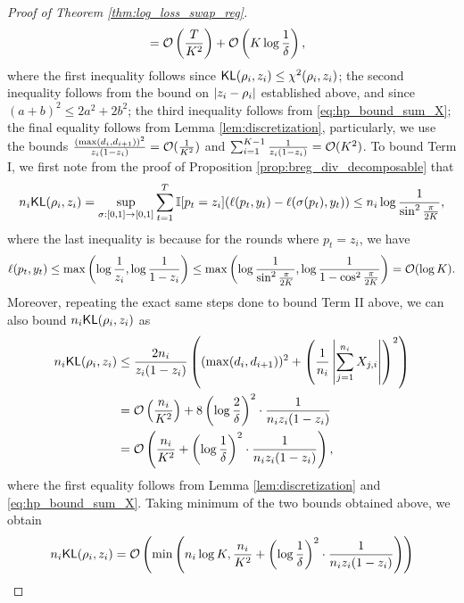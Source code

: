 \begin{proof}[Proof of Theorem \ref{thm:log_loss_swap_reg}]
\begin{align*}
        &= \mathcal{O}\left( \frac{T}{K ^ {2}} \right) + \mathcal{O}\left( K \log \frac{1}{\delta} \right),
    \end{align*}
    where the first inequality follows since $\mathsf{KL}(\rho_{i}, z_{i}) \le \chi^{2}(\rho_{i}, z_{i})$; the second inequality follows from the bound on $\left\lvert z_{i} - \rho_{i}\right\rvert$ established above, and since $(a + b) ^ {2} \le 2 a ^ {2} + 2 b ^ {2}$; the third inequality follows from \eqref{eq:hp_bound_sum_X}; the final equality follows from Lemma \ref{lem:discretization}, particularly, we use the bounds $\frac{(\max(d_{i}, d_{i + 1})) ^ {2}}{z_{i} (1 - z_{i})} = \mathcal{O}(\frac{1}{K^{2}})$ and $\sum_{i = 1} ^ {K - 1} \frac{1}{z_{i}(1 - z_{i})} = \mathcal{O}(K ^ {2})$. To bound Term I, we first note from the proof of Proposition \ref{prop:breg_div_decomposable} that \begin{align*}
        n_{i} \mathsf{KL}(\rho_{i}, z_{i}) = \sup_{\sigma: [0, 1] \to [0, 1]} \sum_{t = 1} ^ {T} \mathbb{I}{\left[p_{t} = z_{i}\right]} (\ell(p_{t}, y_{t}) - \ell(\sigma(p_{t}), y_{t})) \le n_{i} \log \frac{1}{\sin ^ {2} \frac{\pi}{2K}},
    \end{align*}
    where the last inequality is because for the rounds where $p_{t} = z_{i}$, we have \begin{align}\label{eq:range_log_loss}
    \ell(p_{t}, y_{t}) \le \max\left( \log \frac{1}{z_{i}}, \log \frac{1}{1 - z_{i}} \right) \le \max \left( \log \frac{1}{\sin ^ {2} \frac{\pi}{2K}}, \log \frac{1}{1 - \cos ^ {2} \frac{\pi}{2K}} \right) = \mathcal{O}(\log K). 
    \end{align}
    Moreover, repeating the exact same steps done to bound Term II above, we can also bound $n_{i} \mathsf{KL}(\rho_{i}, z_{i})$ as \begin{align*}
        n_{i} \mathsf{KL}(\rho_{i}, z_{i}) &\le {\frac{2n_{i}}{z_{i}(1 - z_{i})} \left( (\max(d_{i}, d_{i + 1})) ^ {2} + \left( \frac{1}{n_{i}}\ensuremath{\left\lvert\sum_{j = 1} ^ {n_{i}} X_{j, i}\right\rvert} \right) ^ {2} \right)} \\
        &=\mathcal{O}\left( \frac{n_{i}}{K ^ {2}} \right)  + 8 \left( \log \frac{2}{\delta} \right)^{2} \cdot \frac{1}{n_{i} z_{i}(1 - z_{i})} \\
        &= \mathcal{O}\left( \frac{n_{i}}{K ^ {2}}  + \left( \log \frac{1}{\delta} \right) ^ {2} \cdot \frac{1}{n_{i} z_{i}(1 - z_{i})} \right),
    \end{align*}
    where the first equality follows from Lemma \ref{lem:discretization} and \eqref{eq:hp_bound_sum_X}. 
    Taking minimum of the two bounds obtained above, we obtain \begin{align*}
        n_{i} \KL(\rho_{i}, z_{i}) &= \cO\bigc{\min\bigc{n_{i} \log K, \frac{n_{i}}{K ^ {2}}  + \bigc{\log \frac{1}{\delta}} ^ {2} \cdot \frac{1}{n_{i} z_{i}(1 - z_{i})}}} \\

\end{align*}
\end{proof}
